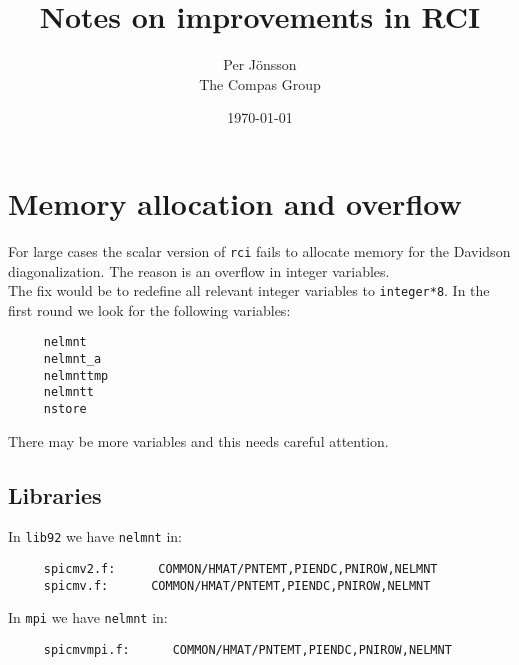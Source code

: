 \documentclass[a4paper,titlepage]{article}
\begin{document}
\title{Notes on improvements in RCI} 
\author{Per J\"onsson\\
The Compas Group}  
\date{\today}
\maketitle

\section{Memory allocation and overflow}
For large cases the scalar version of \verb+rci+ fails to allocate memory for the Davidson diagonalization. The reason is an overflow in integer variables.\medskip\\
The fix would be to redefine all relevant integer variables to \verb+integer*8+. In the first round we look for the following variables:
\begin{verbatim}
     nelmnt
     nelmnt_a
     nelmnttmp
     nelmntt
     nstore
\end{verbatim}
There may be more variables and this needs careful attention.
\subsection*{Libraries}
In \verb+lib92+ we have \verb+nelmnt+ in:
\begin{verbatim}
     spicmv2.f:      COMMON/HMAT/PNTEMT,PIENDC,PNIROW,NELMNT
     spicmv.f:      COMMON/HMAT/PNTEMT,PIENDC,PNIROW,NELMNT
\end{verbatim}
In \verb+mpi+ we have \verb+nelmnt+ in:
\begin{verbatim}
     spicmvmpi.f:      COMMON/HMAT/PNTEMT,PIENDC,PNIROW,NELMNT
\end{verbatim}
\end{document}
